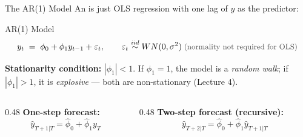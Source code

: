 \documentclass[aspectratio=169, 11pt]{beamer}
\begin{document}
\begin{frame}{The AR(1) Model}
  An  is just OLS regression
  with one lag of $y$ as the predictor:

  \begin{definitionbox}{AR(1) Model}
    \[
      y_t \;=\; \phi_0 + \phi_1 y_{t-1} + \varepsilon_t,
      \qquad \varepsilon_t \overset{iid}{\sim} WN(0,\sigma^2)
      \;\muted{\small\text{(normality not required for OLS)}}
    \]
  \end{definitionbox}
  \vspace{0.1cm}
  \textbf{Stationarity condition:} $|\phi_1| < 1$. If $\phi_1 = 1$, the model
  is a \emph{random walk}; if $|\phi_1| > 1$, it is \emph{explosive} ---
  both are non-stationary (Lecture 4).

  \vspace{0.1cm}
  \begin{columns}[T]
    \begin{column}{0.48\textwidth}
      \textbf{One-step forecast:}
      \[
        \hat{y}_{T+1|T} = \hat{\phi}_0 + \hat{\phi}_1 y_T
      \]
    \end{column}
    \begin{column}{0.48\textwidth}
      \textbf{Two-step forecast (recursive):}
      \[
        \hat{y}_{T+2|T} = \hat{\phi}_0 + \hat{\phi}_1 \hat{y}_{T+1|T}
      \]
    \end{column}
  \end{columns}
  \vspace{0.1cm}
\end{frame}
\end{document}
